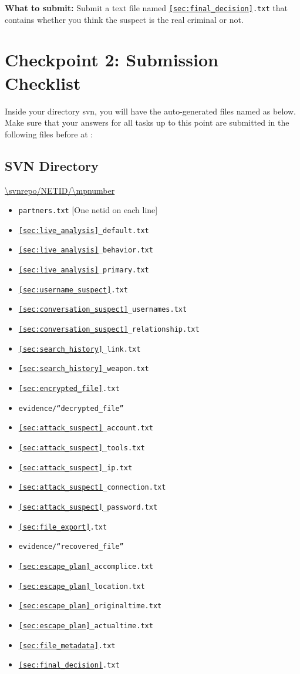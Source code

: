 \documentclass[letterpaper,12pt]{report}
\begin{document}
\medskip 
\textbf{What to submit:} Submit a text file named \texttt{\ref{sec:final_decision}.txt} that contains whether you think the suspect is the real criminal or not.

\newpage

\section*{Checkpoint 2: Submission Checklist}

Inside your \texttt{\mpnumber} directory svn, you will have the auto-generated files named as below.  Make sure that your answers for all tasks up to this point are submitted in the following files before \textbf{\duedate} at \textbf{\duetime}:

\subsection*{SVN Directory}
\url{\svnrepo/NETID/\mpnumber}

\begin{itemize}
\item {\tt partners.txt} [One netid on each line]
\item \texttt{\ref{sec:live_analysis}\_default.txt}
\item \texttt{\ref{sec:live_analysis}\_behavior.txt}
\item \texttt{\ref{sec:live_analysis}\_primary.txt}
\item \texttt{\ref{sec:username_suspect}.txt}
\item \texttt{\ref{sec:conversation_suspect}\_usernames.txt}
\item \texttt{\ref{sec:conversation_suspect}\_relationship.txt}
\item \texttt{\ref{sec:search_history}\_link.txt}
\item \texttt{\ref{sec:search_history}\_weapon.txt}
\item \texttt{\ref{sec:encrypted_file}.txt}
\item \texttt{evidence/``decrypted\_file''}
\item \texttt{\ref{sec:attack_suspect}\_account.txt} 
\item \texttt{\ref{sec:attack_suspect}\_tools.txt}
\item \texttt{\ref{sec:attack_suspect}\_ip.txt}
\item \texttt{\ref{sec:attack_suspect}\_connection.txt}
\item \texttt{\ref{sec:attack_suspect}\_password.txt}
\item \texttt{\ref{sec:file_export}.txt}
\item \texttt{evidence/``recovered\_file''}
\item \texttt{\ref{sec:escape_plan}\_accomplice.txt}
\item \texttt{\ref{sec:escape_plan}\_location.txt}
\item \texttt{\ref{sec:escape_plan}\_originaltime.txt}
\item \texttt{\ref{sec:escape_plan}\_actualtime.txt}
\item \texttt{\ref{sec:file_metadata}.txt}
\item \texttt{\ref{sec:final_decision}.txt}
\end{itemize}
\end{document}
